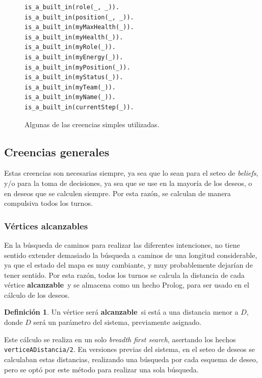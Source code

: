 \documentclass[oneside]{book}
\theoremstyle{definition}
\newtheorem{definicion}{Definición}[section]
\theoremstyle{example}
\begin{document}
\begin{figure}
\begin{verbatim}
is_a_built_in(role(_, _)).
is_a_built_in(position(_, _)).
is_a_built_in(myMaxHealth(_)).
is_a_built_in(myHealth(_)).
is_a_built_in(myRole(_)).
is_a_built_in(myEnergy(_)).
is_a_built_in(myPosition(_)).
is_a_built_in(myStatus(_)).
is_a_built_in(myTeam(_)).
is_a_built_in(myName(_)).
is_a_built_in(currentStep(_)).
\end{verbatim}
\caption{Algunas de las creencias simples utilizadas.}
\label{fig:creenciasSimples}
\end{figure}





\subsection{Creencias generales}

\label{sec:creenciasGenerales}

Estas creencias son necesarias siempre, ya sea que lo sean para el seteo de 
\textit{beliefs}, y/o para la toma de decisiones, ya sea que se use en la mayoría
de los deseos, o en deseos que se calculen siempre. Por esta razón, se calculan
de manera compulsiva todos los turnos.


\subsubsection{Vértices alcanzables}

En la búsqueda de caminos para realizar las diferentes intenciones, no tiene sentido
extender demasiado la búsqueda a caminos de una longitud considerable, ya que el 
estado del mapa es muy cambiante, y muy probablemente dejarían de tener sentido. Por
esta razón, todos los turnos se calcula la distancia de cada vértice 
\textbf{alcanzable}\ y se almacena como un hecho Prolog, para ser usado en el 
cálculo de los deseos.

\begin{definicion}
Un vértice será \textbf{alcanzable}\ si está a una distancia menor a $D$, donde $D$
será un parámetro del sistema, previamente asignado.
\end{definicion}

Este cálculo se realiza en un solo \textit{breadth first search}, asertando los hechos
\texttt{verticeADistancia/2}. En versiones previas del sistema, en el seteo de deseos
se calculaban estas distancias, realizando una búsqueda por cada esquema de deseo, 
pero se optó por este método para realizar una sola búsqueda.
\end{document}
